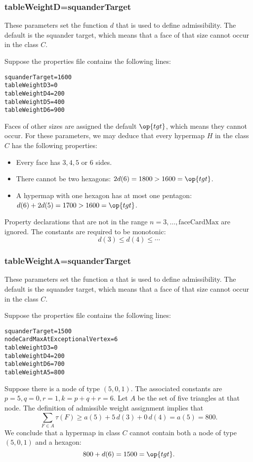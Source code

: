 \subsubsection{tableWeightD\wild =squanderTarget}

These parameters set the function $d$ that is used to define admissibility.
The default is the squander target, which means that a face of that size cannot occur
in the class $C$.

\begin{example} Suppose the properties file contains the following lines:
\begin{verbatim}
squanderTarget=1600
tableWeightD3=0
tableWeightD4=200
tableWeightD5=400
tableWeightD6=900
\end{verbatim}
Faces of other sizes are assigned the default $\op{tgt}$, 
which means they cannot occur.  
For these parameters, 
we may deduce that
every hypermap $H$ in the class $C$ has the following properties:
\begin{itemize}
\item Every face has $3,4,5$ or $6$ sides.
\item There cannot be two hexagons: $2d(6) =1800 > 1600=\op{tgt}$.
\item A hypermap with one hexagon has at most one pentagon: $d(6)+2d(5) = 1700 > 1600 = \op{tgt}$.
\end{itemize}
\end{example}
Property declarations 
that are not in the range $n=3,\ldots,\text{faceCardMax}$ are ignored.
The constants are required to be monotonic:
\[
d(3) \le d(4) \le \cdots
\]

\subsubsection{tableWeightA\wild =squanderTarget}

These parameters set the function $a$ that is used to define admissibility.
The default is the squander target, which means that a face of that size cannot occur
in the class $C$.

\begin{example} Suppose the properties file contains the following lines:
\begin{verbatim}
squanderTarget=1500
nodeCardMaxAtExceptionalVertex=6
tableWeightD3=0
tableWeightD4=200
tableWeightD6=700
tableWeightA5=800
\end{verbatim}
Suppose there is a node of type $(5,0,1)$. The associated constants
are $p=5,q=0,r=1,k=p+q+r=6$.
Let  $A$ be the set of five triangles at that node.  The definition of admissible
weight assignment implies that
\[
\sum_{F\in A}\tau(F) \ge a(5) + 5\, d(3) + 0\, d(4) = a(5) = 800.
\]
We conclude that a hypermap in class $C$ cannot contain both a node of type $(5,0,1)$
and a hexagon: 
\[
800 + d(6) = 1500 = \op{tgt}.
\]
\end{example}

